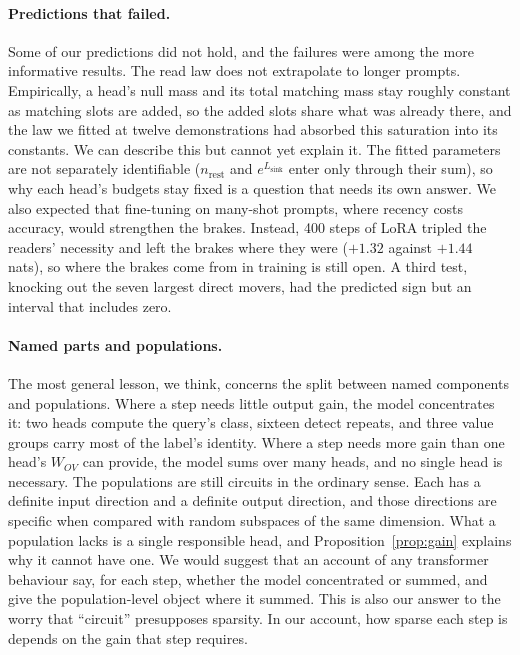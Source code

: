 \documentclass{article}
\begin{document}
\paragraph{Predictions that failed.} Some of our predictions did not hold, and the failures were among the more informative results. The read law does not extrapolate to longer prompts. Empirically, a head's null mass and its total matching mass stay roughly constant as matching slots are added, so the added slots share what was already there, and the law we fitted at twelve demonstrations had absorbed this saturation into its constants. We can describe this but cannot yet explain it. The fitted parameters are not separately identifiable ($n_{\mathrm{rest}}$ and $e^{L_{\mathrm{sink}}}$ enter only through their sum), so why each head's budgets stay fixed is a question that needs its own answer. We also expected that fine-tuning on many-shot prompts, where recency costs accuracy, would strengthen the brakes. Instead, 400 steps of LoRA tripled the readers' necessity and left the brakes where they were ($+1.32$ against $+1.44$ nats), so where the brakes come from in training is still open. A third test, knocking out the seven largest direct movers, had the predicted sign but an interval that includes zero.

\paragraph{Named parts and populations.} The most general lesson, we think, concerns the split between named components and populations. Where a step needs little output gain, the model concentrates it: two heads compute the query's class, sixteen detect repeats, and three value groups carry most of the label's identity. Where a step needs more gain than one head's $W_{OV}$ can provide, the model sums over many heads, and no single head is necessary. The populations are still circuits in the ordinary sense. Each has a definite input direction and a definite output direction, and those directions are specific when compared with random subspaces of the same dimension. What a population lacks is a single responsible head, and Proposition~\ref{prop:gain} explains why it cannot have one. We would suggest that an account of any transformer behaviour say, for each step, whether the model concentrated or summed, and give the population-level object where it summed. This is also our answer to the worry that ``circuit'' presupposes sparsity. In our account, how sparse each step is depends on the gain that step requires.
\end{document}
